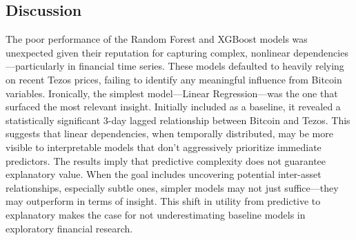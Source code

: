 \subsection{Discussion}

The poor performance of the Random Forest and XGBoost models was unexpected given their reputation for capturing complex, nonlinear dependencies—particularly in financial time series. 
These models defaulted to heavily relying on recent Tezos prices, failing to identify any meaningful influence from Bitcoin variables.
Ironically, the simplest model—Linear Regression—was the one that surfaced the most relevant insight. 
Initially included as a baseline, it revealed a statistically significant 3-day lagged relationship between Bitcoin and Tezos. This suggests that linear dependencies, when temporally distributed, may be more visible to interpretable models that don’t aggressively prioritize immediate predictors.
The results imply that predictive complexity does not guarantee explanatory value. When the goal includes uncovering potential inter-asset relationships, especially subtle ones, simpler models may not just suffice—they may outperform in terms of insight. This shift in utility from predictive to explanatory makes the case for not underestimating baseline models in exploratory financial research.
